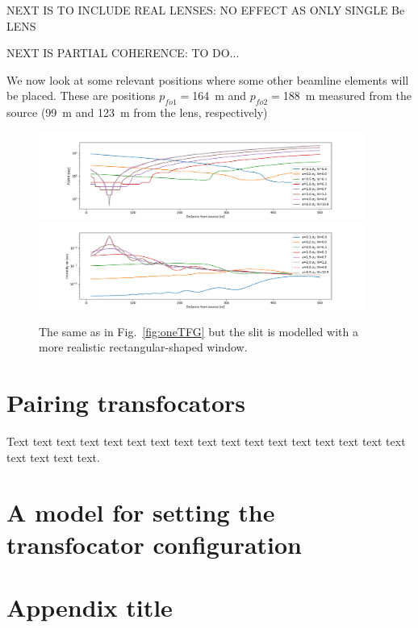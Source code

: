 \documentclass{iucr}              %
\begin{document}
NEXT IS TO INCLUDE REAL LENSES: NO EFFECT AS ONLY SINGLE Be LENS


NEXT IS PARTIAL COHERENCE: TO DO...


We now look at some relevant positions where some other beamline elements will be placed. These are positions $p_{fo1}=$\SI{164}{\meter} and   $p_{fo2}=$\SI{188}{\meter} measured from the source (\SI{99}{\meter} and \SI{123}{\meter} from the lens, respectively)
 
\begin{figure}
    \centering
    \includegraphics[width=0.95\textwidth]{figures/Figure_1.png}
    \includegraphics[width=0.95\textwidth]{figures/Figure_2.png}
    \caption{The same as in Fig.~\ref{fig:oneTFG} but the slit is modelled with a more realistic rectangular-shaped window.}
    \label{fig:oneTF}
\end{figure}

\section{Pairing transfocators}

Text text text text text text text text text text text text text text
text text text text text text text.

\section{A model for setting the transfocator configuration}


\appendix
\section{Appendix title}
\end{document}
